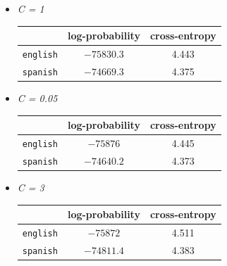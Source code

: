 \documentclass[11pt]{article}
\begin{document}
\begin{enumerate}
\begin{enumerate}[label=(\alph*)]
\begin{itemize}
			\begin{itemize}
			\item[] \hspace{-24pt} \textit{C = 1} 	 \vspace{4pt}
				\begin{center}\begin{tabular}{| r || c | c |}
				\hline
									& log-probability	& cross-entropy \\
				\hline \hline
				\texttt{english}	& $-75830.3$		& 4.443			\\
				\texttt{spanish}	& $-74669.3$		& 4.375			\\
				\hline
				
				\end{tabular}\end{center}
				
			\item[] \hspace{-24pt} \textit{C = 0.05} \vspace{4pt}
				\begin{center}\begin{tabular}{| r || c | c |}
				\hline
									& log-probability	& cross-entropy \\
				\hline \hline
				\texttt{english}	& $-75876$			& 4.445			\\
				\texttt{spanish}	& $-74640.2$		& 4.373			\\
				\hline
				
				\end{tabular}\end{center}

			\item[] \hspace{-24pt} \textit{C = 3} 	 \vspace{4pt} \\
				\begin{center}\begin{tabular}{| r || c | c |}
				\hline
									& log-probability	& cross-entropy \\
				\hline \hline
				\texttt{english}	& $-75872$			& 4.511			\\
				\texttt{spanish}	& $-74811.4$		& 4.383			\\
				\hline
				
				\end{tabular}\end{center}

			\end{itemize} \vspace{8pt}


\end{itemize}
\end{enumerate}
\end{enumerate}
\end{document}
